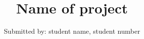 \documentclass[oneside,11pt, hidelinks]{Classes/ProjectPDF}
\title{Name of project}
\author{Submitted by: student name, student number}
\begin{document}

%   






\maketitle


\setcounter{secnumdepth}{3}
\setcounter{tocdepth}{3}

\frontmatter %




\tableofcontents
\newpage
\listoftables
\newpage
\listoffigures



\mainmatter 






\renewcommand{\bibname}{References} %
\renewcommand{\bibfont}{\small}   
\begin{singlespace}
\setlength{\itemsep}{0pt}


\end{singlespace}



\appendix




\end{document}
